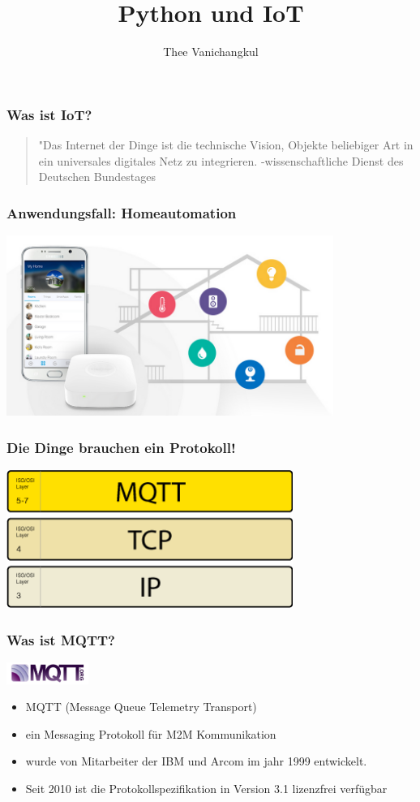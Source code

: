 \documentclass[11pt]{beamer}
\author{Thee Vanichangkul}
\title{Python und IoT}
\begin{document}
\begin{frame}
\titlepage
\end{frame}

\begin{frame}
	\frametitle{Was ist IoT?}
	\begin{quotation}
		"Das Internet der Dinge ist die technische Vision, Objekte beliebiger Art in ein universales digitales Netz zu integrieren. -wissenschaftliche Dienst des Deutschen Bundestages
	\end{quotation}
\end{frame}

\begin{frame}
	\frametitle{Anwendungsfall: Homeautomation}
	\begin{center}
		\includegraphics[width=0.8\textwidth]{Samsung_Hub.png}
	\end{center}
\end{frame}

\begin{frame}
	\frametitle{Die Dinge brauchen ein Protokoll!}
	\begin{center}
		\includegraphics[width=0.7\textwidth]{mqtt-tcp-ip-stack.png}
	\end{center}
\end{frame}

\begin{frame}
	\frametitle{Was ist MQTT?}
	\includegraphics[width=0.2\textwidth]{mqtt.png}
	\begin{itemize}
		\item MQTT (Message Queue Telemetry Transport)
		\item ein Messaging Protokoll für M2M Kommunikation 
		\item wurde von Mitarbeiter der IBM und Arcom im jahr 1999 entwickelt.
		\item Seit 2010 ist die Protokollspezifikation in Version 3.1 lizenzfrei verfügbar
	\end{itemize}
\end{frame}
\end{document}
